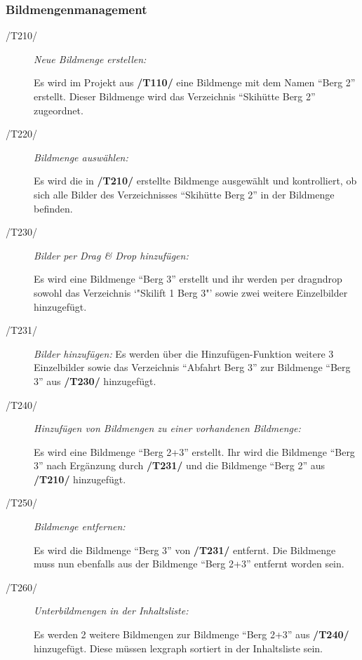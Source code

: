 	\subsubsection{Bildmengenmanagement}
		
		\begin{description}
		
			\item[/T210/] \textit{Neue Bildmenge erstellen:}\par Es wird im Projekt aus \textbf{/T110/} eine Bildmenge mit dem Namen "`Berg 2"' erstellt. Dieser Bildmenge wird das Verzeichnis "`Skihütte Berg 2"' zugeordnet.
				
			\item[/T220/] \textit{Bildmenge auswählen:}\par Es wird die in \textbf{/T210/} erstellte Bildmenge ausgewählt und kontrolliert, ob sich alle Bilder des Verzeichnisses "`Skihütte Berg 2"' in der Bildmenge befinden.

			\item[/T230/] \textit{Bilder per Drag \& Drop hinzufügen:}\par Es wird eine Bildmenge "`Berg 3"' erstellt und ihr werden per \gls{dragndrop} sowohl das Verzeichnis `"Skilift 1 Berg 3"' sowie zwei weitere Einzelbilder hinzugefügt.
			
			\item[/T231/] \textit{Bilder hinzufügen:} Es werden über die Hinzufügen-Funktion weitere 3 Einzelbilder sowie das Verzeichnis "`Abfahrt Berg 3"' zur Bildmenge "`Berg 3"' aus \textbf{/T230/} hinzugefügt.
			
			\item[/T240/] \textit{Hinzufügen von Bildmengen zu einer vorhandenen Bildmenge:}\par Es wird eine Bildmenge "`Berg 2+3"' erstellt. Ihr wird die Bildmenge "`Berg 3"' nach Ergänzung durch \textbf{/T231/} und die Bildmenge "`Berg 2"' aus \textbf{/T210/} hinzugefügt.
				
			\item[/T250/] \textit{Bildmenge entfernen:}\par Es wird die Bildmenge "`Berg 3"' von \textbf{/T231/} entfernt. Die Bildmenge muss nun ebenfalls aus der Bildmenge "`Berg 2+3"' entfernt worden sein.
			
			\item[/T260/] \textit{Unterbildmengen in der Inhaltsliste:}\par Es werden 2 weitere Bildmengen zur Bildmenge "`Berg 2+3"' aus \textbf{/T240/} hinzugefügt. Diese müssen \gls{lexgraph} sortiert in der Inhaltsliste sein.
			

\end{description}
